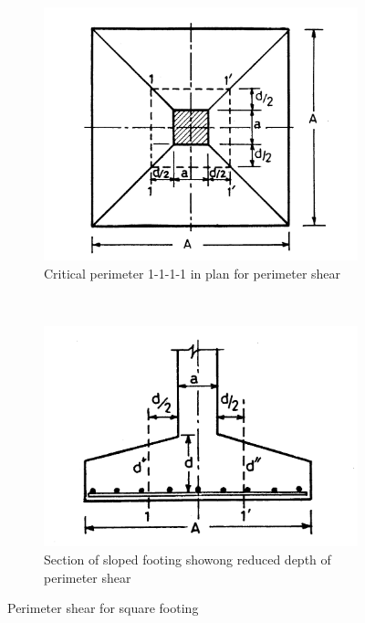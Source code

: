 \documentclass{report}
\begin{document}
\begin{figure}
  \begin{subfigure}[b]{0.5\textwidth}
    \includegraphics[width=\textwidth]{images/fig2301.png}
    \caption{Critical perimeter 1-1-1-1 in plan for perimeter shear}
    \label{fig:1}
  \end{subfigure}\\
  \begin{subfigure}[b]{0.5\textwidth}
    \includegraphics[width=\textwidth]{images/fig2302.png}
    \caption{Section of sloped footing showong reduced depth of perimeter shear}
    \label{fig:2}
  \end{subfigure}
\caption{Perimeter shear for square footing}
\end{figure}
\end{document}

